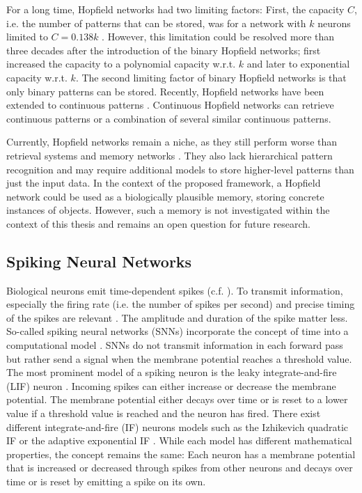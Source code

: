 For a long time, Hopfield networks had two limiting factors: First, the capacity $C$, i.e. the number of patterns that can be stored, was for a network with $k$ neurons limited to $C=0.138k$ .
However, this limitation could be resolved more than three decades after the introduction of the binary Hopfield networks; 
 first increased the capacity to a polynomial capacity w.r.t. $k$ and  later to exponential capacity w.r.t. $k$.
The second limiting factor of binary Hopfield networks is that only binary patterns can be stored.
Recently, Hopfield networks have been extended to continuous patterns .
Continuous Hopfield networks can retrieve continuous patterns or a combination of several similar continuous patterns.

Currently, Hopfield networks remain a niche, as they still perform worse than retrieval systems  and memory networks .
They also lack hierarchical pattern recognition and may require additional models to store higher-level patterns than just the input data.
In the context of the proposed framework, a Hopfield network could be used as a biologically plausible memory, storing concrete instances of objects.
However, such a memory is not investigated within the context of this thesis and remains an open question for future research.


\subsection{Spiking Neural Networks}
Biological neurons emit time-dependent spikes (c.f. ).
To transmit information, especially the firing rate (i.e. the number of spikes per second) and precise timing of the spikes are relevant .
The amplitude and duration of the spike matter less.
So-called spiking neural networks (SNNs) incorporate the concept of time into a computational model .
SNNs do not transmit information in each forward pass but rather send a signal when the membrane potential reaches a threshold value. 
The most prominent model of a spiking neuron is the leaky integrate-and-fire (LIF) neuron .
Incoming spikes can either increase or decrease the membrane potential.
The membrane potential either decays over time or is reset to a lower value if a threshold value is reached and the neuron has fired.
There exist different integrate-and-fire (IF) neurons models such as the Izhikevich quadratic IF  or the adaptive exponential IF .
While each model has different mathematical properties, the concept remains the same: Each neuron has a membrane potential that is increased or decreased through spikes from other neurons and decays over time or is reset by emitting a spike on its own.


